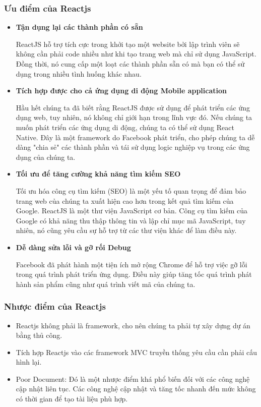 \subsubsection{Ưu điểm của Reactjs}
\begin{itemize}
    \item \textbf{Tận dụng lại các thành phần có sẵn}

    \indent ReactJS hỗ trợ tích cực trong khởi tạo một website bởi lập trình viên sẽ không cần phải code nhiều như khi tạo trang web mà chỉ sử dụng JavaScript. Đồng thời, nó cung cấp một loạt các thành phần sẵn có mà bạn có thể sử dụng trong nhiều tình huống khác nhau.
    \item \textbf{Tích hợp được cho cả ứng dụng di động Mobile application}

    \indent Hầu hết chúng ta đã biết rằng ReactJS được sử dụng để phát triển các ứng dụng web, tuy nhiên, nó không chỉ giới hạn trong lĩnh vực đó. Nếu chúng ta muốn phát triển các ứng dụng di động, chúng ta có thể sử dụng React Native. Đây là một framework do Facebook phát triển, cho phép chúng ta dễ dàng "chia sẻ" các thành phần và tái sử dụng logic nghiệp vụ trong các ứng dụng của chúng ta.
    \item \textbf{Tối ưu để tăng cường khả năng tìm kiếm SEO}

    \indent Tối ưu hóa công cụ tìm kiếm (SEO) là một yếu tố quan trọng để đảm bảo trang web của chúng ta xuất hiện cao hơn trong kết quả tìm kiếm của Google. ReactJS là một thư viện JavaScript cơ bản. Công cụ tìm kiếm của Google có khả năng thu thập thông tin và lập chỉ mục mã JavaScript, tuy nhiên, nó cũng yêu cầu sự hỗ trợ từ các thư viện khác để làm điều này.
    \item \textbf{Dễ dàng sửa lỗi và gỡ rối Debug}

    \indent Facebook đã phát hành một tiện ích mở rộng Chrome để hỗ trợ việc gỡ lỗi trong quá trình phát triển ứng dụng. Điều này giúp tăng tốc quá trình phát hành sản phẩm cũng như quá trình viết mã của chúng ta.
\end{itemize}
\subsubsection{Nhược điểm của Reactjs}
\begin{itemize}
    \item Reactjs không phải là framework, cho nên chúng ta phải tự xây dựng dự án bằng thủ công.
    \item Tích hợp Reactjs vào các framework MVC truyền thống yêu cầu cần phải cấu hình lại.
    \item Poor Document: Đó là một nhược điểm khá phổ biến đối với các công nghệ cập nhật liên tục. Các công nghệ cập nhật và tăng tốc nhanh đến mức không có thời gian để tạo tài liệu phù hợp.
\end{itemize}
